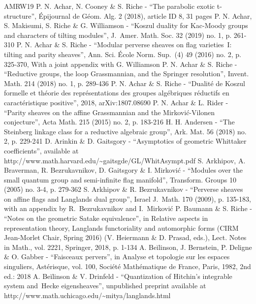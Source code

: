 \begin{thebibliography}{AMRW19}
 P. N. Achar, N. Cooney \& S. Riche - “The parabolic exotic t-structure”, Épijournal de Géom. Alg. 2 (2018), article ID 8, 31 pages
 P. N. Achar, S. Makisumi, S. Riche \& G. Williamson - “Koszul duality for Kac-Moody groups and characters of tilting modules”, J. Amer. Math. Soc. 32 (2019) no. 1, p. 261-310
 P. N. Achar \& S. Riche - “Modular perverse sheaves on flag varieties I: tilting and parity sheaves”, Ann. Sci. École Norm. Sup. (4) 49 (2016) no. 2, p. 325-370, With a joint appendix with G. Williamson
 P. N. Achar \& S. Riche - “Reductive groups, the loop Grassmannian, and the Springer resolution”, Invent. Math. 214 (2018) no. 1, p. 289-436
 P. N. Achar \& S. Riche - “Dualité de Koszul formelle et théorie des représentations des groupes algébriques réductifs en caractéristique positive”, 2018, arXiv:1807.08690
 P. N. Achar \& L. Rider - “Parity sheaves on the affine Grassmannian and the Mirković-Vilonen conjecture”, Acta Math. 215 (2015) no. 2, p. 183-216
 H. H. Andersen - “The Steinberg linkage class for a reductive algebraic group”, Ark. Mat. 56 (2018) no. 2, p. 229-241
 D. Arinkin \& D. Gaitsgory - “Asymptotics of geometric Whittaker coefficients”, available at http://www.math.harvard.edu/\textasciitilde{}gaitsgde/GL/WhitAsympt.pdf
 S. Arkhipov, A. Braverman, R. Bezrukavnikov, D. Gaitsgory \& I. Mirković - “Modules over the small quantum group and semi-infinite flag manifold”, Transform. Groups 10 (2005) no. 3-4, p. 279-362
 S. Arkhipov \& R. Bezrukavnikov - “Perverse sheaves on affine flags and Langlands dual group”, Israel J. Math. 170 (2009), p. 135-183, with an appendix by R. Bezrukavnikov and I. Mirković
 P. Baumann \& S. Riche - “Notes on the geometric Satake equivalence”, in Relative aspects in representation theory, Langlands functoriality and automorphic forms (CIRM Jean-Morlet Chair, Spring 2016) (V. Heiermann \& D. Prasad, eds.), Lect. Notes in Math., vol. 2221, Springer, 2018, p. 1-134
 A. Beĭlinson, J. Bernstein, P. Deligne \& O. Gabber - “Faisceaux pervers”, in Analyse et topologie sur les espaces singuliers, Astérisque, vol. 100, Société Mathématique de France, Paris, 1982, 2nd ed.: 2018
 A. Beĭlinson \& V. Drinfeld - “Quantization of Hitchin’s integrable system and Hecke eigensheaves”, unpublished preprint available at http://www.math.uchicago.edu/\textasciitilde{}mitya/langlands.html

\end{thebibliography}
